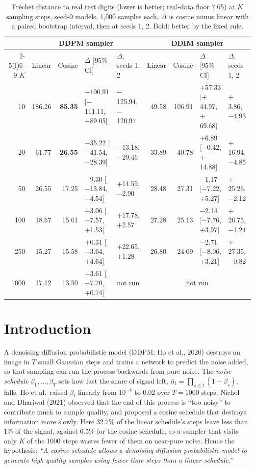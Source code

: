 \documentclass[10pt,a4paper,twocolumn]{article}
\begin{document}
\begin{table}[t]
\centering
\footnotesize
\begin{tabular}{@{}r rrll rrll@{}}
\toprule
& \multicolumn{4}{c}{DDPM sampler} & \multicolumn{4}{c}{DDIM sampler} \\
\cmidrule(lr){2-5}\cmidrule(l){6-9}
$K$ & Linear & Cosine & $\Delta$ [95\% CI] & $\Delta$, seeds 1, 2 & Linear & Cosine &
$\Delta$ [95\% CI] & $\Delta$, seeds 1, 2 \\
\midrule
10 & 186.26 & \textbf{85.35} & $-$100.91 [$-$111.11, $-$89.05] & $-$125.94, $-$120.97 & 49.58 & 106.91 & $+$57.33 [$+$44.97, $+$69.68] & $+$3.86, $-$4.93 \\
20 & 61.77 & \textbf{26.55} & $-$35.22 [$-$41.54, $-$28.39] & $-$13.18, $-$29.46 & 33.89 & 40.78 & $+$6.89 [$-$0.42, $+$14.88] & $+$16.94, $-$4.85 \\
50 & 26.55 & 17.25 & $-$9.30 [$-$13.84, $-$4.54] & $+$14.59, $-$2.90 & 28.48 & 27.31 & $-$1.17 [$-$7.22, $+$5.27] & $+$25.26, $-$2.12 \\
100 & 18.67 & 15.61 & $-$3.06 [$-$7.57, $+$1.53] & $+$17.78, $+$2.57 & 27.28 & 25.13 & $-$2.14 [$-$7.76, $+$3.97] & $+$26.75, $-$1.24 \\
250 & 15.27 & 15.58 & $+$0.31 [$-$3.64, $+$4.64] & $+$22.65, $+$1.28 & 26.80 & 24.09 & $-$2.71 [$-$8.06, $+$3.21] & $+$27.35, $-$0.82 \\
1000 & 17.12 & 13.50 & $-$3.61 [$-$7.70, $+$0.74] & not run & \multicolumn{4}{c}{not run} \\
\bottomrule
\end{tabular}
\caption{Fr\'echet distance to real test digits (lower is better; real-data floor 7.65) at
$K$ sampling steps, seed-0 models, 1,000 samples each. $\Delta$ is cosine minus linear with a
paired bootstrap interval, then at seeds 1, 2. Bold: better by the fixed rule.}
\end{table}

\section{Introduction}
A denoising diffusion probabilistic model (DDPM; Ho et al., 2020) destroys an image in $T$ small
Gaussian steps and trains a network to predict the noise added, so that sampling can run the
process backwards from pure noise. The \emph{noise schedule} $\beta_1, \dots, \beta_T$ sets how
fast the share of signal left, $\bar\alpha_t = \prod_{s \le t}(1 - \beta_s)$, falls. Ho et al.\
raised $\beta_t$ linearly from $10^{-4}$ to 0.02 over $T = 1000$ steps. Nichol and Dhariwal (2021)
observed that the end of this process is ``too noisy'' to contribute much to sample quality, and
proposed a cosine schedule that destroys information more slowly. Here 32.7\% of
the linear schedule's steps leave less than 1\% of the signal, against 6.5\% for
the cosine schedule, so a sampler that visits only $K$ of the 1000 steps wastes fewer of them on
near-pure noise. Hence the hypothesis: \emph{``A cosine schedule allows a denoising diffusion
probabilistic model to generate high-quality samples using fewer time steps than a linear
schedule.''}
\end{document}
